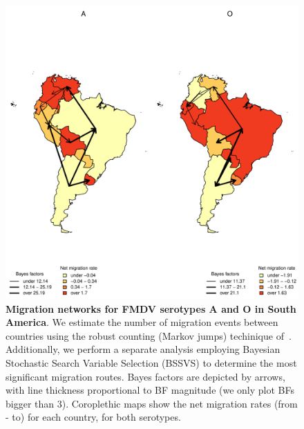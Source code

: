 \documentclass[10pt]{article}
\begin{document}
\begin{figure}[!ht]
\begin{center}
\includegraphics[scale=1]{FIGURES/PLOTS/MJandBFs.pdf}
\end{center}
\caption{\textbf{Migration networks for FMDV serotypes A and O in South America}.
We estimate the number of migration events between countries using the robust counting (Markov jumps) techinique of~\cite{Minin2008b}.
Additionally, we perform a separate analysis employing Bayesian Stochastic Search Variable Selection (BSSVS) to determine the most significant migration routes.
Bayes factors are depicted by arrows, with line thickness proportional to BF magnitude (we only plot BFs bigger than $3$).
Coroplethic maps show the net migration rates (from - to) for each country, for both serotypes.
}
\label{fig:mj&BFs}
\end{figure}
\end{document}
